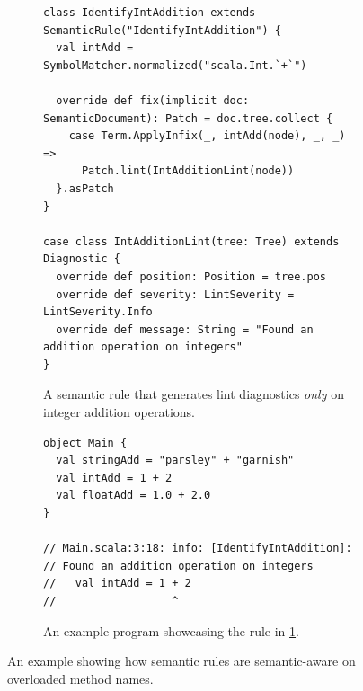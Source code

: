 \documentclass[../../main.tex]{subfiles}
\begin{document}
\begin{figure}[htbp]
\begin{subfigure}{\textwidth}
\begin{verbatim}
class IdentifyIntAddition extends SemanticRule("IdentifyIntAddition") {
  val intAdd = SymbolMatcher.normalized("scala.Int.`+`")

  override def fix(implicit doc: SemanticDocument): Patch = doc.tree.collect {
    case Term.ApplyInfix(_, intAdd(node), _, _) =>
      Patch.lint(IntAdditionLint(node))
  }.asPatch
}

case class IntAdditionLint(tree: Tree) extends Diagnostic {
  override def position: Position = tree.pos
  override def severity: LintSeverity = LintSeverity.Info
  override def message: String = "Found an addition operation on integers"
}
\end{verbatim}
\caption{A semantic rule that generates lint diagnostics \emph{only} on integer addition operations.}
\label{fig:semantic-rule-ex-impl}
\end{subfigure}
%
\begin{subfigure}{\textwidth}
\vspace{3ex} %
\begin{verbatim}
object Main {
  val stringAdd = "parsley" + "garnish"
  val intAdd = 1 + 2
  val floatAdd = 1.0 + 2.0
}

// Main.scala:3:18: info: [IdentifyIntAddition]:
// Found an addition operation on integers
//   val intAdd = 1 + 2
//                  ^
\end{verbatim}
\caption{An example program showcasing the rule in \cref{fig:semantic-rule-ex-impl}.}
\label{fig:semantic-rule-ex-example}
\end{subfigure}
\caption{An example showing how semantic rules are semantic-aware on overloaded method names.}
\label{fig:semantic-rule-ex}
\end{figure}

\end{document}

